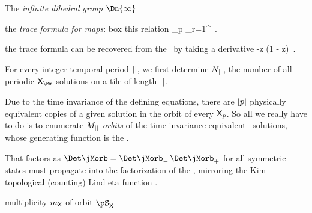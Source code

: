 The \emph{infinite dihedral group} $\Dn{\infty}$ 




the {\em trace formula for maps}:
\PC{} {box this relation}
\beq
    \sum_p  \sum_{r=1}^\infty
    {}
\,.

the trace formula  can be recovered
from the \Fd\ by taking a derivative
\beq
    -z 
          \ln \det(1 - z\Lop)
    \,.




For every integer temporal period
${||}$, we first determine $N_{||}$, the number of all periodic
\emph{{\lattstate}} ${\Xx}_{\Mm}$ solutions on a tile of length
${||}$.


Due to
the time invariance of the defining equations, there are ${|p|}$
physically equivalent copies of a given solution in the orbit of
every $\mathsf{X}_p$. So all we really have to do is to enumerate $M_{||}$
{\em orbits} of the time-invariance equivalent \po\ solutions,
whose generating function is the {\tzeta}.

\bigskip\bigskip

That {\HillDet} factors as
\(
\Det\jMorb  = \Det\jMorb_{-}\,\Det\jMorb_{+}
\)
for all symmetric states must propagate into the factorization of the
{\dzeta}, mirroring the Kim \etal{} topological (counting)
Lind eta function .

multiplicity $m_{\mathsf{X}}$ of orbit $\pS_\Xx$ 
